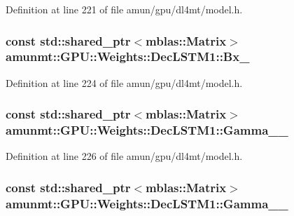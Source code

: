 Definition at line 221 of file amun/gpu/dl4mt/model.\+h.

\subsubsection[{\texorpdfstring{Bx\+\_\+}{Bx_}}]{\setlength{\rightskip}{0pt plus 5cm}const std\+::shared\+\_\+ptr$<${\bf mblas\+::\+Matrix}$>$ amunmt\+::\+G\+P\+U\+::\+Weights\+::\+Dec\+L\+S\+T\+M1\+::\+Bx\+\_\+}\hypertarget{structamunmt_1_1GPU_1_1Weights_1_1DecLSTM1_a1b3722163a279f235e46795762d8c6a1}{}\label{structamunmt_1_1GPU_1_1Weights_1_1DecLSTM1_a1b3722163a279f235e46795762d8c6a1}


Definition at line 224 of file amun/gpu/dl4mt/model.\+h.

\subsubsection[{\texorpdfstring{Gamma\+\_\+1\+\_\+}{Gamma_1_}}]{\setlength{\rightskip}{0pt plus 5cm}const std\+::shared\+\_\+ptr$<${\bf mblas\+::\+Matrix}$>$ amunmt\+::\+G\+P\+U\+::\+Weights\+::\+Dec\+L\+S\+T\+M1\+::\+Gamma\+\_\+\_\+}\hypertarget{structamunmt_1_1GPU_1_1Weights_1_1DecLSTM1_afd4e493898528c6048cab37f2a74e7d9}{}\label{structamunmt_1_1GPU_1_1Weights_1_1DecLSTM1_afd4e493898528c6048cab37f2a74e7d9}


Definition at line 226 of file amun/gpu/dl4mt/model.\+h.

\subsubsection[{\texorpdfstring{Gamma\+\_\+2\+\_\+}{Gamma_2_}}]{\setlength{\rightskip}{0pt plus 5cm}const std\+::shared\+\_\+ptr$<${\bf mblas\+::\+Matrix}$>$ amunmt\+::\+G\+P\+U\+::\+Weights\+::\+Dec\+L\+S\+T\+M1\+::\+Gamma\+\_\+\_\+}\hypertarget{structamunmt_1_1GPU_1_1Weights_1_1DecLSTM1_a6fadb1d7a99e6d7d5d311ee88c6a3825}{}\label{structamunmt_1_1GPU_1_1Weights_1_1DecLSTM1_a6fadb1d7a99e6d7d5d311ee88c6a3825}


